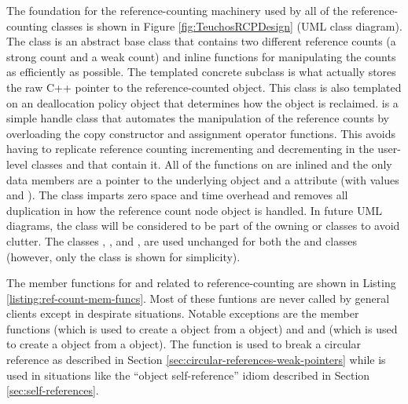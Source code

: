 \documentclass[pdf,ps2pdf,11pt]{SANDreport}
\begin{document}
The foundation for the reference-counting machinery used by all of the
reference-counting classes is shown in Figure
{}\ref{fig:TeuchosRCPDesign} (UML class diagram).  The class
{} is an abstract base class that contains two
different reference counts (a strong count and a weak count) and
inline functions for manipulating the counts as efficiently as
possible.  The templated concrete subclass {} is
what actually stores the raw C++ pointer to the reference-counted
object.  This class is also templated on an deallocation policy object
that determines how the object is reclaimed.  {}
is a simple handle class that automates the manipulation of the
reference counts by overloading the copy constructor and assignment
operator functions.  This avoids having to replicate reference
counting incrementing and decrementing in the user-level classes
{} and {} that contain it.  All of the
functions on {} are inlined and the only data
members are a pointer to the underlying {} object and
a {} attribute (with values {}
and {}).  The class {} imparts
zero space and time overhead and removes all duplication in how the
reference count node object is handled.  In future UML diagrams, the
{} class will be considered to be part of the
owning {} or {} classes to avoid clutter.
The classes {}, {}, and
{}, are used unchanged for both the
{} and {} classes (however, only the
{} class is shown for simplicity).

The member functions for {} and {} related to
reference-counting are shown in Listing
{}\ref{listing:ref-count-mem-funcs}.  Most of these funtions are never
called by general clients except in despirate situations.  Notable
exceptions are the member functions {} (which is
used to create a {} {} object from a {}
object) and and {} (which is used to create a
{} {} object from a {} object).  The
function {} is used to break a circular reference
as described in Section {}\ref{sec:circular-references-weak-pointers}
while {} is used in situations like the ``object
self-reference'' idiom described in Section
{}\ref{sec:self-references}.
\end{document}
